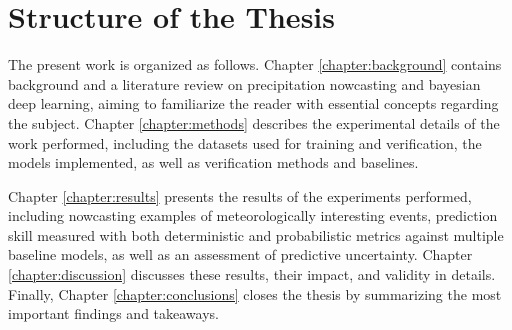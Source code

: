 \section{Structure of the Thesis}

The present work is organized as follows. Chapter \ref{chapter:background} contains background and a literature review on precipitation nowcasting and bayesian deep learning, aiming to familiarize the reader with essential concepts regarding the subject. Chapter \ref{chapter:methods} describes the experimental details of the work performed, including the datasets used for training and verification, the models implemented, as well as verification methods and baselines. 

Chapter \ref{chapter:results} presents the results of the experiments performed, including nowcasting examples of meteorologically interesting events, prediction skill measured with both deterministic and probabilistic metrics against multiple baseline models, as well as an assessment of predictive uncertainty. Chapter \ref{chapter:discussion} discusses these results, their impact, and validity in details. Finally, Chapter \ref{chapter:conclusions} closes the thesis by summarizing the most important findings and takeaways. 



